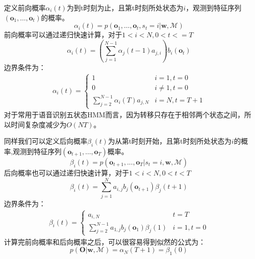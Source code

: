 定义前向概率$\alpha_i(t)$为到t时刻为止，且第t时刻所处状态为$i$，观测到特征序列$\left( \mathbf{o}_1, \dots, \mathbf{o}_t \right)$的概率。
\begin{equation}
\alpha_i(t)=p(\mathbf{o}_1, \dots, \mathbf{o}_t,s_t=i|\mathbf{w}, \mathcal{M})
\end{equation}
前向概率可以通过递归快速计算，对于$1<i<N, 0<t<=T$
\begin{equation}
\alpha_i(t)=(\sum_{j=1}^{N-1}\alpha_j(t-1)a_{j,i})b_i(\mathbf{o}_t)
\end{equation}
边界条件为：
\begin{eqnarray}
\alpha_i(t)=
\begin{cases}
1& i=1,t=0 \\
0& i \ne 1,t=0 \\
\sum_{j=2}^{N-1}\alpha_i(T)a_{j,N}& i=N, t=T+1
\end{cases}
\end{eqnarray}
对于常用于语音识别五状态HMM而言，因为转移只存在于相邻两个状态之间，所以时间复杂度减少为$O(NT)$。

同样我们可以定义后向概率$\beta_i(t)$为从第t时刻开始，且第t时刻所处状态为$i$的概率,观测到特征序列$\left( \mathbf{o}_{t+1}, \dots, \mathbf{o}_T \right)$概率。
\begin{equation}
\beta_i(t)=p(\mathbf{o}_{t+1},...,\mathbf{o}_T|s_t=i, \mathbf{w}, \mathcal{M})
\end{equation}
后向概率也可以通过递归快速计算，对于$1<i<N, 0<t<T$
\begin{equation}
\beta_i(t)=\sum_{j=1}^{N} a_{i,j} b_j(\mathbf{o}_{t+1}) \beta_j(t+1)
\end{equation}
边界条件为：
\begin{eqnarray}
\beta_i(t)=
\begin{cases}
a_{i,N} & t=T \\
\sum_{j=2}^{N-1} a_{1,j} b_j(\mathbf{o}_{1}) \beta_j(1) & i=1, t=0
\end{cases}
\end{eqnarray}
计算完前向概率和后向概率之后，可以很容易得到似然的公式为：
\begin{equation}
    p(\mathbf{O}|\mathbf{w}, \mathcal{M})=\alpha_N(T+1)=\beta_1(0)
\end{equation}

